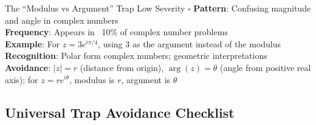 \documentclass{article}
\begin{document}
\begin{trapbox}{The ``Modulus vs Argument'' Trap \colorbox{yellow!20}{Low Severity} $\square$}
\textbf{Pattern}: Confusing magnitude and angle in complex numbers\\
\textbf{Frequency}: Appears in ~10\% of complex number problems\\
\textbf{Example}: For $z = 3e^{i\pi/4}$, using 3 as the argument instead of the modulus\\
\textbf{Recognition}: Polar form complex numbers; geometric interpretations\\
\textbf{Avoidance}: $|z| = r$ (distance from origin), $\arg(z) = \theta$ (angle from positive real axis); for $z = re^{i\theta}$, modulus is $r$, argument is $\theta$
\end{trapbox}

\subsection{Universal Trap Avoidance Checklist}
\end{document}
